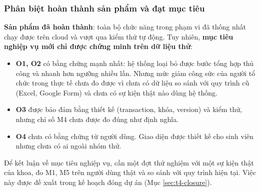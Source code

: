 \subsubsection{Phân biệt hoàn thành sản phẩm và đạt mục tiêu}

\textbf{Sản phẩm đã hoàn thành}: toàn bộ chức năng trong phạm vi đã thống nhất chạy được trên cloud và vượt qua kiểm thử tự động. Tuy nhiên, \textbf{mục tiêu nghiệp vụ mới chỉ được chứng minh trên dữ liệu thử}:
\begin{itemize}
    \item \textbf{O1, O2} có bằng chứng mạnh nhất: hệ thống loại bỏ được bước tổng hợp thủ công và nhanh hơn ngưỡng nhiều lần. Nhưng mức giảm công sức của người tổ chức trong thực tế chưa đo được vì chưa có dữ liệu so sánh với quy trình cũ (Excel, Google Form) và chưa có sự kiện thật nào dùng hệ thống.
    \item \textbf{O3} được bảo đảm bằng thiết kế (transaction, khóa, version) và kiểm thử, nhưng chỉ số M4 chưa được đo đúng như định nghĩa.
    \item \textbf{O4} chưa có bằng chứng từ người dùng. Giao diện được thiết kế cho sinh viên nhưng chưa có ai ngoài nhóm thử.
\end{itemize}
Để kết luận về mục tiêu nghiệp vụ, cần một đợt thử nghiệm với một sự kiện thật của khoa, đo M1, M5 trên người dùng thật và so sánh với quy trình hiện tại. Việc này được đề xuất trong kế hoạch đóng dự án (Mục \ref{sec:t4-closure}).
